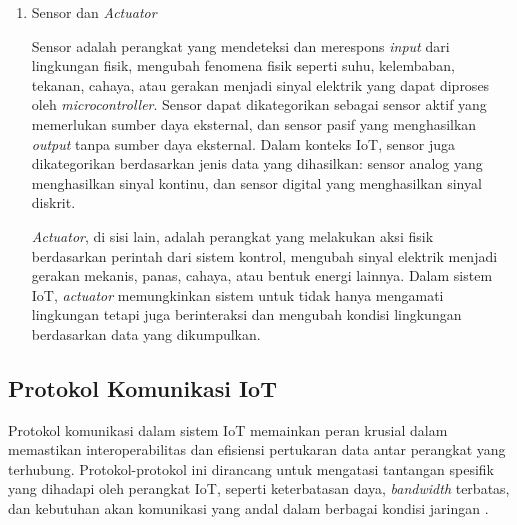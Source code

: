 \begin{enumerate}
  \item Sensor dan \textit{Actuator}

  Sensor adalah perangkat yang mendeteksi dan merespons \textit{input} dari lingkungan fisik, mengubah fenomena fisik seperti suhu, kelembaban, tekanan, cahaya, atau gerakan menjadi sinyal elektrik yang dapat diproses oleh \textit{microcontroller}. Sensor dapat dikategorikan sebagai sensor aktif yang memerlukan sumber daya eksternal, dan sensor pasif yang menghasilkan \textit{output} tanpa sumber daya eksternal. Dalam konteks IoT, sensor juga dikategorikan berdasarkan jenis data yang dihasilkan: sensor analog yang menghasilkan sinyal kontinu, dan sensor digital yang menghasilkan sinyal diskrit.

  \textit{Actuator}, di sisi lain, adalah perangkat yang melakukan aksi fisik berdasarkan perintah dari sistem kontrol, mengubah sinyal elektrik menjadi gerakan mekanis, panas, cahaya, atau bentuk energi lainnya. Dalam sistem IoT, \textit{actuator} memungkinkan sistem untuk tidak hanya mengamati lingkungan tetapi juga berinteraksi dan mengubah kondisi lingkungan berdasarkan data yang dikumpulkan.
\end{enumerate}

\subsection{Protokol Komunikasi IoT}
\label{sec:studi-protokol}

Protokol komunikasi dalam sistem IoT memainkan peran krusial dalam memastikan interoperabilitas dan efisiensi pertukaran data antar perangkat yang terhubung. Protokol-protokol ini dirancang untuk mengatasi tantangan spesifik yang dihadapi oleh perangkat IoT, seperti keterbatasan daya, \textit{bandwidth} terbatas, dan kebutuhan akan komunikasi yang andal dalam berbagai kondisi jaringan \autocite{alfuqaha2015}.


